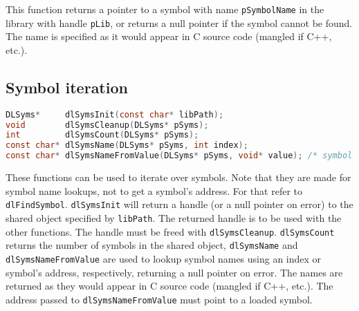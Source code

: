 This function returns a pointer to a symbol with name \lstinline{pSymbolName} in the
library with handle \lstinline{pLib}, or returns a null pointer if the symbol cannot
be found. The name is specified as it would appear in C source code (mangled if C++, etc.).

\subsection{Symbol iteration}

\begin{lstlisting}[language=c]
DLSyms*     dlSymsInit(const char* libPath);
void        dlSymsCleanup(DLSyms* pSyms);
int         dlSymsCount(DLSyms* pSyms);
const char* dlSymsName(DLSyms* pSyms, int index);
const char* dlSymsNameFromValue(DLSyms* pSyms, void* value); /* symbol must be loaded */
\end{lstlisting}

These functions can be used to iterate over symbols. Note that they are made
for symbol name lookups, not to get a symbol's address. For that refer to
\lstinline{dlFindSymbol}. \lstinline{dlSymsInit} will return a handle (or a null pointer
on error) to the shared object specified by \lstinline{libPath}. The returned
handle is to be used with the other functions. The handle must be freed with
\lstinline{dlSymsCleanup}. \lstinline{dlSymsCount} returns the number of
symbols in the shared object, \lstinline{dlSymsName} and \lstinline{dlSymsNameFromValue}
are used to lookup symbol names using an index or symbol's address, respectively,
returning a null pointer on error. The names are returned as they would appear
in C source code (mangled if C++, etc.). The address passed to \lstinline{dlSymsNameFromValue}
must point to a loaded symbol.

